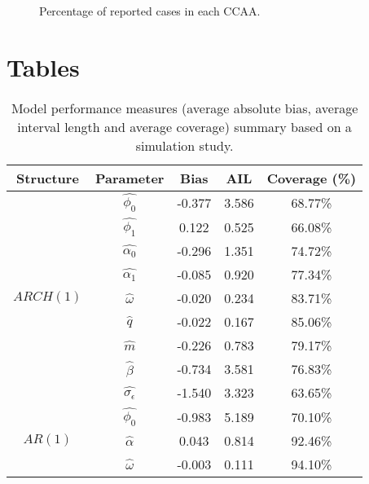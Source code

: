 \documentclass{bmcart}
\begin{document}
\begin{backmatter}
\begin{figure}[ht]
  \caption{\label{morina:fig3} Percentage of reported cases in each CCAA.}
\end{figure}


\section*{Tables}

\begin{table}[h!]
\tiny\sf\centering
\caption{Model performance measures (average absolute bias, average interval length and average coverage) summary based on a simulation study.\label{tab:estim_sim}}
\begin{tabular}{ccccc}
\hline
Structure & Parameter & Bias & AIL & Coverage (\%)\\
\hline
\multirow{9}{*}{$ARCH(1)$}    & $\hat{\phi_0}$            &-0.377 & 3.586 & 68.77\% \\
                              & $\hat{\phi_1}$            & 0.122 & 0.525 & 66.08\% \\
                              & $\hat{\alpha_0}$          &-0.296 & 1.351 & 74.72\% \\
                              & $\hat{\alpha_1}$          &-0.085 & 0.920 & 77.34\% \\
                              & $\hat{\omega}$            &-0.020 & 0.234 & 83.71\% \\
                              & $\hat{q}$                 &-0.022 & 0.167 & 85.06\% \\
                              & $\hat{m}$                 &-0.226 & 0.783 & 79.17\% \\
                              & $\hat{\beta}$             &-0.734 & 3.581 & 76.83\% \\
                              & $\hat{\sigma_{\epsilon}}$ &-1.540 & 3.323 & 63.65\% \\
\hline
\multirow{7}{*}{$AR(1)$}      & $\hat{\phi_0}$            &-0.983 & 5.189 & 70.10\% \\
                              & $\hat{\alpha}$            & 0.043 & 0.814 & 92.46\% \\
                              & $\hat{\omega}$            &-0.003 & 0.111 & 94.10\% \\

\end{tabular}
\end{table}
\end{backmatter}
\end{document}
